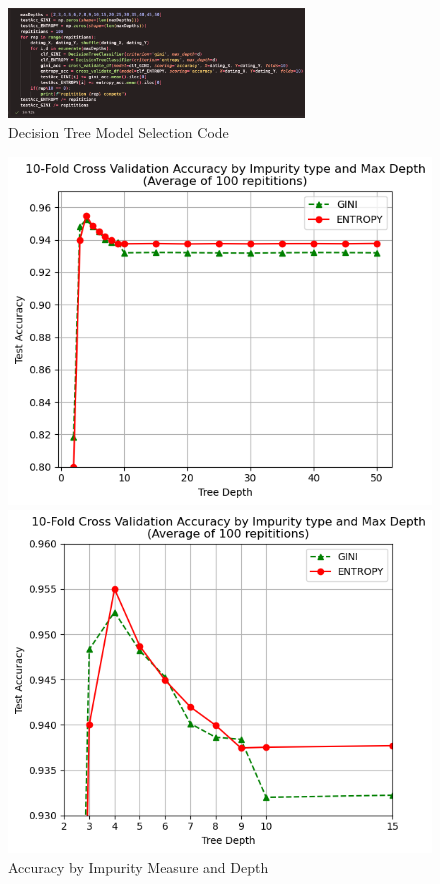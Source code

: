 \documentclass{article}
\begin{document}
    \begin{figure}[H]
        \centering
        \includegraphics[width=0.7\textwidth, height=0.18\textheight]{tree_selection_code.png}
        \caption{\small{Decision Tree Model Selection Code}}
    \end{figure}
    \begin{figure}[H]
        \centering
        \begin{minipage}[t]{0.49\textwidth}
            \centering
            \includegraphics[width=\textwidth, height=0.25\textheight]{tree_selection1.png}
            \caption{\small{Accuracy by Impurity Measure and Depth}}
        \end{minipage}
        \hfill
        \begin{minipage}[t]{0.49\textwidth}
            \centering
            \includegraphics[width=\textwidth, height=0.25\textheight]{tree_selection2.png}

\end{minipage}
\end{figure}
\end{document}
